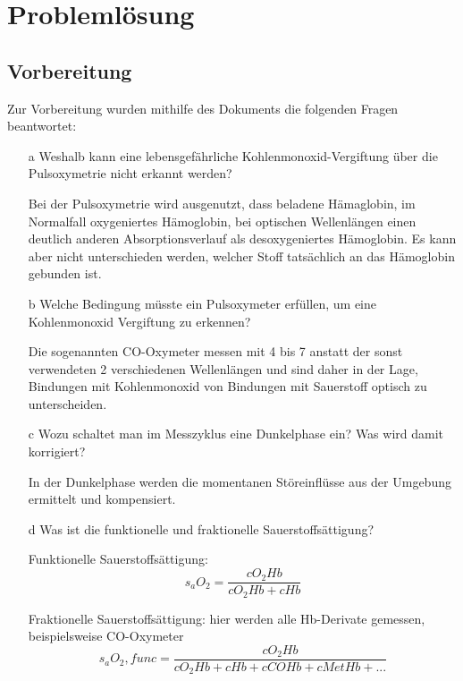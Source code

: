 \documentclass[11pt]{scrartcl}
\begin{document}
    \section{Problemlösung}

    \subsection{Vorbereitung}
    Zur Vorbereitung wurden mithilfe des Dokuments \cite{Pulsoxymetrie} die folgenden Fragen beantwortet:
    
    \begin{itemize}
        \item[a]  Weshalb kann eine lebensgefährliche Kohlenmonoxid-Vergiftung über die
        Pulsoxymetrie nicht erkannt werden?
        \item[] Bei der Pulsoxymetrie wird ausgenutzt, dass beladene Hämaglobin, im Normalfall oxygeniertes Hämoglobin, %
        bei optischen Wellenlängen einen deutlich anderen Absorptionsverlauf als desoxygeniertes Hämoglobin.
        Es kann aber nicht unterschieden werden, welcher Stoff tatsächlich an das Hämoglobin gebunden ist.
        \item[b] Welche Bedingung müsste ein Pulsoxymeter erfüllen, um eine Kohlenmonoxid Vergiftung zu erkennen?
        \item[]  Die sogenannten CO-Oxymeter messen mit 4 bis 7 anstatt der sonst verwendeten 2 verschiedenen Wellenlängen und sind daher in der 
        Lage, Bindungen mit Kohlenmonoxid von Bindungen mit Sauerstoff optisch zu unterscheiden.
        \item[c] Wozu schaltet man im Messzyklus eine Dunkelphase ein? Was wird damit
        korrigiert?
        \item[] In der Dunkelphase werden die momentanen Störeinflüsse aus der Umgebung ermittelt und kompensiert.
        \item[d] Was ist die funktionelle und fraktionelle Sauerstoffsättigung?
        \item[] Funktionelle Sauerstoffsättigung: 
        \begin{equation}
            s_aO_2 = \frac{cO_2Hb}{cO_2Hb + cHb} 
        \end{equation}
        \item[] Fraktionelle Sauerstoffsättigung: hier werden alle Hb-Derivate gemessen, beispielsweise CO-Oxymeter
        \begin{equation}
            s_aO_2,func = \frac{cO_2Hb}{cO_2Hb + cHb + cCOHb + cMetHb + ...} 

\end{equation}
\end{itemize}
\end{document}
